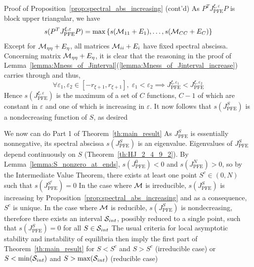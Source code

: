 \documentclass[aspectratio=169]{beamer}
\begin{document}
\begin{frame}{Proof of Proposition~\ref{prop:spectral_abs_increasing} (cont'd)}
	As $P^TJ_{\textrm{PFE}}^{\xi,\varepsilon}P$ is block upper triangular, we have
	\[
	s(P^TJ_{\textrm{PFE}}^{\xi,\varepsilon}P)
	=
	\max\left\{s(\M_{11}+E_1),\ldots,s(\M_{CC}+E_C)\right\}
	\]
	\vfill
	Except for $\M_{\eta\eta}+E_\eta$, all matrices $\M_{ii}+E_i$ have fixed spectral abscissa.
	Concerning matrix $\M_{\eta\eta}+E_\eta$, it is clear that the reasoning in the proof of Lemma~\ref{lemma:Mness_of_Jinterval}(\ref{lemma:Mness_of_Jinterval_increase}) carries through and thus,
	\[
	\forall \varepsilon_1,\varepsilon_2\in[-r_{\xi+1},r_{\xi+1}],
	\;
	\varepsilon_1<\varepsilon_2
	\implies
	J_{\textrm{PFE}}^{\xi,\varepsilon_1}
	< J_{\textrm{PFE}}^{\xi,\varepsilon_2}
	\]
	\vfill
	Hence $s(J_{\textrm{PFE}}^{\xi,\varepsilon})$ is the maximum of a set of $C$ functions, $C-1$ of which are constant in $\varepsilon$ and one of which is increasing in $\varepsilon$. 
	It now follows that $s(J_{\textrm{PFE}}^S)$ is a nondecreasing function of $S$, as desired
\end{frame}

\begin{frame}{We now can do Part 1 of Theorem~\ref{th:main_result}}
	As $J_{\textrm{PFE}}^S$ is essentially nonnegative, its spectral abscissa $s(J_{\textrm{PFE}}^S)$ is an eigenvalue.
	Eigenvalues of $J_{\textrm{PFE}}^S$ depend continuously on $S$ (Theorem~\ref{th:HJ_2_4_9_2}). By Lemma~\ref{lemma:S_nonzero_at_ends}, $s(J_{\textrm{PFE}}^0)<0$ and $s(J_{\textrm{PFE}}^N)>0$, so by the Intermediate Value Theorem, there exists at least one point $S^c\in(0,N)$ such that $s(J_{\textrm{PFE}}^{S^c})=0$
	\vfill
	In the case where $\M$ is irreducible, $s(J_{\textrm{PFE}}^S)$ is increasing by Proposition~\ref{prop:spectral_abs_increasing} and as a consequence, $S^c$ is unique. In the case where $\M$ is reducible, $s(J_{\textrm{PFE}}^S)$ is nondecreasing, therefore there exists an interval $\S_{int}$, possibly reduced to a single point, such that $s(J_{\textrm{PFE}}^S)=0$ for all $S\in\S_{int}$
	\vfill
	The usual criteria for local asymptotic stability and instability of equilibria then imply the first part of Theorem~\ref{th:main_result} for $S<S^c$ and $S>S^c$ (irreducible case) or $S<\min(\S_{int})$ and $S>\max(\S_{int})$ (reducible case)
\end{frame}
\end{document}
